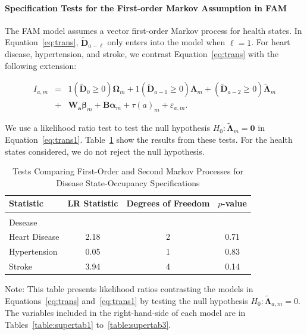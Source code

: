 \paragraph{Specification Tests for the First-order Markov Assumption in FAM} \label{section:firstorder}

\noindent The FAM model assumes a vector first-order Markov process for health states. In Equation~\eqref{eq:trans}, $\tilde{\bm{D}}_{a - \ell}$ only enters into the model when $\ell = 1$. For heart disease, hypertension, and stroke, we contrast Equation~\eqref{eq:trans} with the following extension: 

\begin{eqnarray}
I_{a,m} &=&  \bm{\mathit{1}} \left( \tilde{\bm{D}}_{0} \geq 0 \right) \bm{\Omega}_{m} + \bm{\mathit{1}} \left( \tilde{\bm{D}}_{a-1} \geq 0\right) \bm{\Lambda}_{m}  + \left( \tilde{\bm{D}}_{a-2} \geq 0\right) \tilde{\bm{\Lambda}}_{m} \nonumber \\
&+& \bm{W_a} \bm{\beta}_{m} + \bm{B} \bm{\alpha}_m + \tau(a)_m + \varepsilon_{a,m}. \label{eq:trans1}
\end{eqnarray}

We use a likelihood ratio test to test the null hypothesis $H_0: \tilde{\bm{\Lambda}}_{m} = \bm{0}$ in Equation~\eqref{eq:trans1}. Table~\ref{table:lrtests} show the results from these tests. For the health states considered, we do not reject the null hypothesis.

\begin{table}[H]
\begin{threeparttable}
\caption{Tests Comparing First-Order and Second Markov Processes for Disease State-Occupancy Specifications} \label{table:lrtests}
\centering
\footnotesize
\begin{tabular}{lccc}
\toprule
Statistic & LR Statistic & Degrees of Freedom & $p$-value \\
\midrule \\
Desease & \\
Heart Disease & 2.18 & 2 & 0.71 \\
Hypertension   & 0.05 & 1 & 0.83 \\
Stroke              & 3.94 & 4 & 0.14 \\
\bottomrule
\end{tabular}
\begin{tablenotes}
\footnotesize
\item Note: This table presents likelihood ratios contrasting the models in Equations~\eqref{eq:trans} and~\eqref{eq:trans1} by testing the null hypothesis $H_0: \tilde{\bm{\Lambda}}_{a,m}=0$. The variables included in the right-hand-side of each model are in Tables~\ref{table:supertab1} to~\ref{table:supertab3}. 
\end{tablenotes}
\end{threeparttable}
\end{table}


